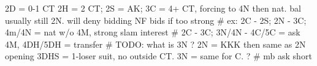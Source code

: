 2D = 0-1 CT
2H = 2 CT; 2S = AK; 3C = 4+ CT, forcing to 4N
    then nat. bal usually still 2N. will deny bidding NF bids if too strong
    # ex: 2C - 2S; 2N - 3C; 4m/4N = nat w/o 4M, strong slam interest
    # 2C - 3C; 3N/4N - 4C/5C = ask 4M, 4DH/5DH = transfer
    # TODO: what is 3N ?
2N = KKK
    then same as 2N opening
3DHS = 1-loser suit, no outside CT. 3N = same for C.
    ?  # mb ask short
